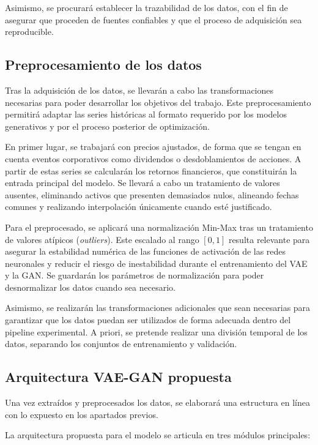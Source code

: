 Asimismo, se procurará establecer la trazabilidad de los datos, con el fin de asegurar que proceden de fuentes confiables y que el proceso de adquisición sea reproducible.

\subsection{Preprocesamiento de los datos}

Tras la adquisición de los datos, se llevarán a cabo las transformaciones necesarias para poder desarrollar los objetivos del trabajo. Este preprocesamiento permitirá adaptar las series históricas al formato requerido por los modelos generativos y por el proceso posterior de optimización.

En primer lugar, se trabajará con precios ajustados, de forma que se tengan en cuenta eventos corporativos como dividendos o desdoblamientos de acciones. A partir de estas series se calcularán los retornos financieros, que constituirán la entrada principal del modelo. Se llevará a cabo un tratamiento de valores ausentes, eliminando activos que presenten demasiados nulos, alineando fechas comunes y realizando interpolación únicamente cuando esté justificado.

Para el preprocesado, se aplicará una normalización Min-Max tras un tratamiento de valores atípicos (\textit{outliers}). Este escalado al rango $[0,1]$ resulta relevante para asegurar la estabilidad numérica de las funciones de activación de las redes neuronales y reducir el riesgo de inestabilidad durante el entrenamiento del VAE y la GAN. Se guardarán los parámetros de normalización para poder desnormalizar los datos cuando sea necesario.

Asimismo, se realizarán las transformaciones adicionales que sean necesarias para garantizar que los datos puedan ser utilizados de forma adecuada dentro del pipeline experimental. A priori, se pretende realizar una división temporal de los datos, separando los conjuntos de entrenamiento y validación.

\subsection{Arquitectura VAE-GAN propuesta}

Una vez extraídos y preprocesados los datos, se elaborará una estructura en línea con lo expuesto en los apartados previos.

La arquitectura propuesta para el modelo se articula en tres módulos principales:

